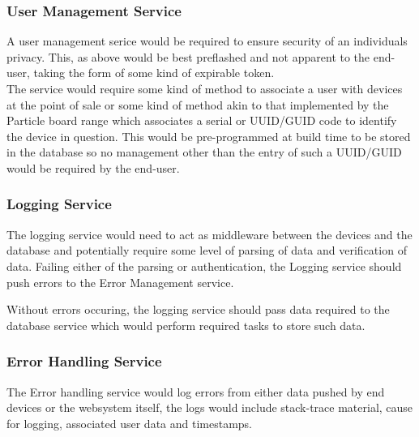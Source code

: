 \documentclass{article}
\begin{document}
            \subsubsection{User Management Service}
            A user management serice would be required to ensure security of an individuals privacy.
            This, as above would be best preflashed and not apparent to the end-user, taking the form of
            some kind of expirable token.
            \\
            The service would require some kind of method to associate a user with devices at the point of sale
            or some kind of method akin to that implemented by the Particle board range \cite{Particle}
            which associates a serial or UUID/GUID code to identify the device in question.
            This would be pre-programmed at build time to be stored in the database so no management 
            other than the entry of such a UUID/GUID would be required by the end-user.

            \subsubsection{Logging Service}
            The logging service would need to act as middleware between the devices and the database and 
            potentially require some level of parsing of data and verification of data. Failing either of the
            parsing or authentication, the Logging service should push errors to the Error Management service.
            \par
            Without errors occuring, the logging service should pass data required to the database service which
            would perform required tasks to store such data.

            \subsubsection{Error Handling Service}
            The Error handling service would log errors from either data pushed by end devices or the websystem itself,
            the logs would include stack-trace material, cause for logging, associated user data and timestamps.
\end{document}

